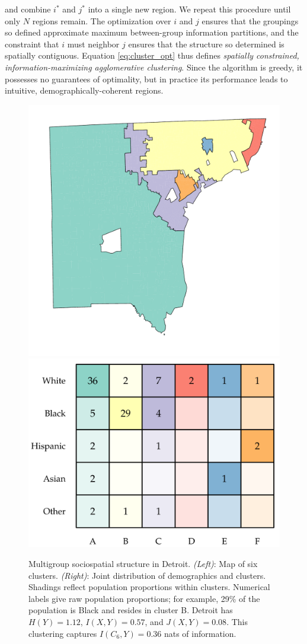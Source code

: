 \documentclass[9pt,twocolumn,twoside]{pnas-new}
\begin{document}
	and combine $i^*$ and $j^*$ into a single new region. We repeat this procedure until only $N$ regions remain. The optimization over $i$ and $j$ ensures that the groupings so defined approximate maximum between-group information partitions, and the constraint that $i$ must neighbor $j$ ensures that the structure so determined is spatially contiguous. Equation \eqref{eq:cluster_opt} thus defines \emph{spatially constrained, information-maximizing agglomerative clustering}. Since the algorithm is greedy, it possesses no guarantees of optimality, but in practice its performance leads to intuitive, demographically-coherent regions. 
	
	\begin{figure}
		\centering
			\includegraphics[width = .4\linewidth]{figs/example_cluster_map.pdf}
			\includegraphics[width = .4\linewidth]{figs/example_clusters_detailed.pdf}
			\caption{
				Multigroup sociospatial structure in Detroit. 
				\emph{(Left)}: Map of six clusters. 
				\emph{(Right)}: Joint distribution of demographics and clusters. 
				Shadings reflect population proportions within clusters. 
				Numerical labels give raw population proportions; for example, 29\% of the population is Black and resides in cluster B. 
				Detroit has $H(Y) = 1.12$, $I(X,Y) = 0.57$, and $J(X,Y) = 0.08$. 
				This clustering captures $I(C_6,Y) = 0.36$ nats of information.
			} \label{fig:detroit}
	\end{figure}
\end{document}
